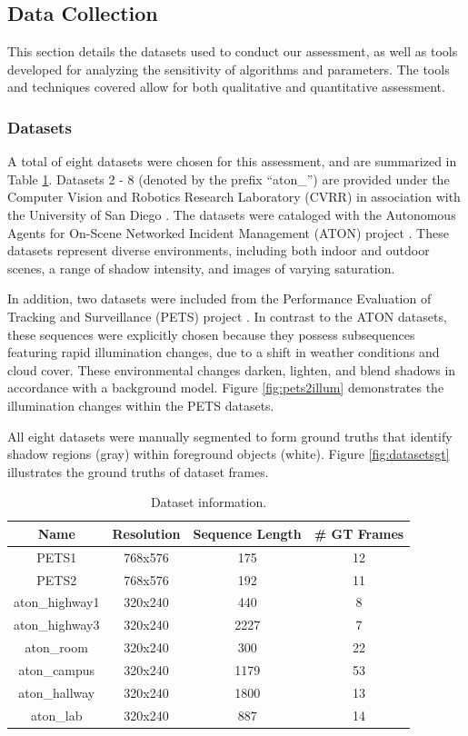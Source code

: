 \subsection{Data Collection}  \label{section:datacollection}

This section details the datasets used to conduct our assessment, as well as tools developed for analyzing the sensitivity of algorithms and parameters. The tools and techniques covered allow for both qualitative and quantitative assessment.

\subsubsection{Datasets}

A total of eight datasets were chosen for this assessment, and are summarized in Table \ref{table:datasets}. Datasets 2 - 8 (denoted by the prefix ``aton\_'') are provided under the Computer Vision and Robotics Research Laboratory (CVRR) in association with the University of San Diego \cite{cvrr}. The datasets were cataloged with the Autonomous Agents for On-Scene Networked Incident Management (ATON) project \cite{aton2002}. These datasets represent diverse environments, including both indoor and outdoor scenes, a range of shadow intensity, and images of varying saturation.

In addition, two datasets were included from the Performance Evaluation of Tracking and Surveillance (PETS) project \cite{pets2001}. In contrast to the ATON datasets, these sequences were explicitly chosen because they possess subsequences featuring rapid illumination changes, due to a shift in weather conditions and cloud cover. These environmental changes darken, lighten, and blend shadows in accordance with a background model. Figure \ref{fig:pets2illum} demonstrates the illumination changes within the PETS datasets.

All eight datasets were manually segmented to form ground truths that identify shadow regions (gray) within foreground objects (white). Figure \ref{fig:datasetsgt} illustrates the ground truths of dataset frames.


\begin{table}
\centering
\begin{tabular}{ |c|c|c|c| }
	\hline
	\textbf{Name} & \textbf{Resolution} & \textbf{Sequence Length} & \textbf{\# GT Frames} \\
	\hline
	\hline
	PETS1 & 768x576 & 175 & 12 \\
	\hline
	PETS2 & 768x576 & 192 & 11 \\
	\hline
	aton\_highway1 & 320x240 & 440 & 8 \\
	\hline 
	aton\_highway3 & 320x240 & 2227 & 7 \\ 
	\hline
	aton\_room & 320x240 & 300 & 22 \\ 
	\hline
	aton\_campus & 320x240 & 1179 & 53 \\ 
	\hline
	aton\_hallway & 320x240 & 1800 & 13 \\
	\hline
	aton\_lab & 320x240 & 887 & 14 \\ 
	\hline
\end{tabular}
\caption{Dataset information.}
\label{table:datasets}
\end{table}


